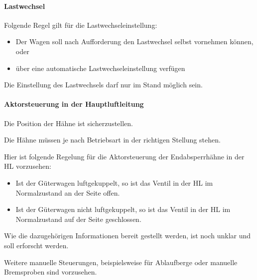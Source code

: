\paragraph{Lastwechsel}
\begin{feat}
Folgende Regel gilt für die \gls{Lastwechsel}einstellung:
\begin{itemize}
    \item Der Wagen soll nach Aufforderung den \gls{Lastwechsel} selbst vornehmen können, oder
    \item über eine automatische \gls{Lastwechsel}einstellung verfügen
\end{itemize}
\end{feat}
\begin{feat}
Die Einstellung des Lastwechsels darf nur im Stand möglich sein.
\end{feat}

\paragraph{Aktorsteuerung in der Hauptluftleitung}
\begin{feat}
Die Position der Hähne ist sicherzustellen.
\end{feat}
\begin{feat}
Die Hähne müssen je nach Betriebsart in der richtigen Stellung stehen.
\end{feat}
\begin{feat}
Hier ist folgende Regelung für die Aktorsteuerung der Endabsperrhähne in der \acrshort{HL} vorzusehen:
\begin{itemize}
    \item Ist der Güterwagen luftgekuppelt, so ist das Ventil in der \acrshort{HL} im Normalzustand an der Seite offen.
    \item Ist der Güterwagen nicht luftgekuppelt, so ist das Ventil in der \acrshort{HL} im Normalzustand auf der Seite geschlossen.
\end{itemize}
\end{feat}
\begin{rem}[zu Anf. 52]
Wie die dazugehörigen Informationen bereit gestellt werden, ist noch unklar und soll erforscht werden.
\end{rem}
\begin{rem}[zu Anf. 52]
Weitere manuelle Steuerungen, beispielsweise für Ablaufberge oder manuelle Bremsproben sind vorzusehen.
\end{rem}

